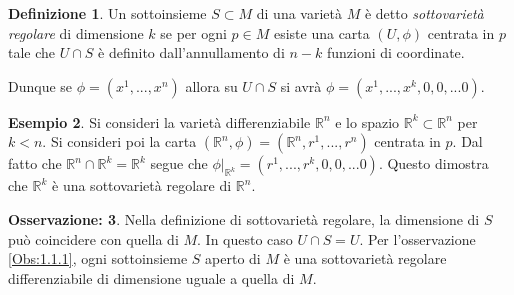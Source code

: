 \documentclass[12pt,a4paper]{report}
\theoremstyle{definition}
\newtheorem{Def}{Definizione}[chapter]
\theoremstyle{Theorem}
\theoremstyle{definition}
\newtheorem{Ex}[Def]{Esempio}
\theoremstyle{definition}
\theoremstyle{definition}
\newtheorem{Obs}[Def]{Osservazione:}
\begin{document}
\begin{Def}
	Un sottoinsieme $S\subset M$ di una varietà $M$ è detto \textit{sottovarietà regolare} di dimensione $k$ se per ogni $p\in M$ esiste una carta $(U,\phi)$ centrata in $p$ tale che $U\cap S$ è definito dall'annullamento di $n-k$ funzioni di coordinate.
\end{Def}
Dunque se $\phi=(x^1,...,x^n)$ allora su $U\cap S$ si avrà $\phi=(x^1,...,x^k,0,0,...0)$.
\begin{Ex}
	Si consideri la varietà differenziabile $\mathbb{R}^n$ e lo spazio $\mathbb{R}^k\subset\mathbb{R}^n$ per $k<n$. Si consideri poi la carta $(\mathbb{R}^n,\phi)=(\mathbb{R}^n,r^1,...,r^n)$ centrata in $p$. Dal fatto che $\mathbb{R}^n\cap \mathbb{R}^k=\mathbb{R}^k$ segue che $\phi|_{\mathbb{R}^k}=(r^1,...,r^k,0,0,...0)$. Questo dimostra che $\mathbb{R}^k$ è una sottovarietà regolare di $\mathbb{R}^n$.
\end{Ex}
\begin{Obs} \label{Obs:1.1.2}
	Nella definizione di sottovarietà regolare, la dimensione di $S$ può coincidere con quella di $M$. In questo caso $U\cap S=U$. Per l'osservazione \ref{Obs:1.1.1}, ogni sottoinsieme $S$ aperto di $M$ è una sottovarietà regolare differenziabile di dimensione uguale a quella di $M$.
\end{Obs}
\end{document}
